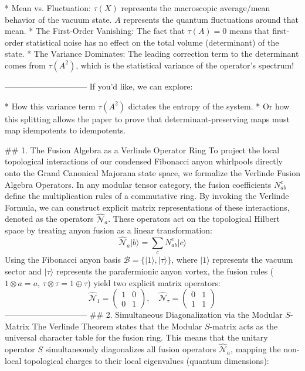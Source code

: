 * Mean vs. Fluctuation: $\tau(X)$ represents the macroscopic average/mean behavior of the vacuum state. $A$ represents the quantum fluctuations around that mean.
* The First-Order Vanishing: The fact that $\tau(A) = 0$ means that first-order statistical noise has no effect on the total volume (determinant) of the state.
* The Variance Dominates: The leading correction term to the determinant comes from $\tau(A^2)$, which is the statistical variance of the operator's spectrum!

------------------------------
If you'd like, we can explore:

* How this variance term $\tau(A^2)$ dictates the entropy of the system.
* Or how this splitting allows the paper to prove that determinant-preserving maps must map idempotents to idempotents.


## 1. The Fusion Algebra as a Verlinde Operator Ring
To project the local topological interactions of our condensed Fibonacci anyon whirlpools directly onto the Grand Canonical Majorana state space, we formalize the Verlinde Fusion Algebra Operators.
In any modular tensor category, the fusion coefficients $N_{ab}^c$ define the multiplication rules of a commutative ring. By invoking the Verlinde Formula, we can construct explicit matrix representations of these interactions, denoted as the operators $\hat{\mathcal{N}}_a$. These operators act on the topological Hilbert space by treating anyon fusion as a linear transformation:
$$\hat{\mathcal{N}}_a \vert{}b\rangle = \sum_{c} N_{ab}^c \vert{}c\rangle$$ 
Using the Fibonacci anyon basis $\mathcal{B} = \{\vert{}1\rangle, \vert{}\tau\rangle\}$, where $\vert{}1\rangle$ represents the vacuum sector and $\vert{}\tau\rangle$ represents the parafermionic anyon vortex, the fusion rules ($1 \otimes a = a$, $\tau \otimes \tau = 1 \oplus \tau$) yield two explicit matrix operators:
$$\hat{\mathcal{N}}_1 = \begin{pmatrix} 1 & 0 \\ 0 & 1 \end{pmatrix}, \quad \hat{\mathcal{N}}_\tau = \begin{pmatrix} 0 & 1 \\ 1 & 1 \end{pmatrix}$$ 
------------------------------
## 2. Simultaneous Diagonalization via the Modular $S$-Matrix
The Verlinde Theorem states that the Modular $S$-matrix acts as the universal character table for the fusion ring. This means that the unitary operator $S$ simultaneously diagonalizes all fusion operators $\hat{\mathcal{N}}_a$, mapping the non-local topological charges to their local eigenvalues (quantum dimensions):
